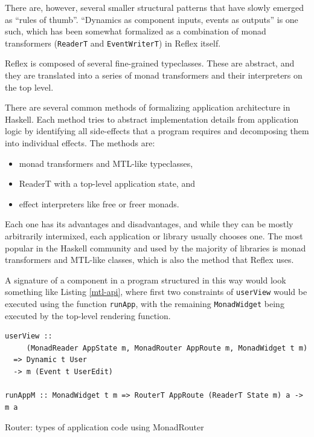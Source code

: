 \documentclass[english,zadani,odsaz]{fitthesis}
\begin{document}
There are, however, several smaller structural patterns that have slowly emerged
as ``rules of thumb''. ``Dynamics as component inputs, events as outputs'' is one
such, which has been somewhat formalized as a combination of monad transformers
(\texttt{ReaderT} and \texttt{EventWriterT}) in Reflex itself.

Reflex is composed of several fine-grained typeclasses. These are abstract, and
they are translated into a series of monad transformers and their interpreters
on the top level.

There are several common methods of formalizing application architecture in
Haskell. Each method tries to abstract implementation details from application
logic by identifying all side-effects that a program requires and decomposing
them into individual effects. The methods are:

\begin{itemize}
\item monad transformers and MTL-like typeclasses,
\item ReaderT with a top-level application state, and
\item effect interpreters like free or freer monads.
\end{itemize}

Each one has its advantages and disadvantages, and while they can be mostly
arbitrarily intermixed, each application or library usually chooses one. The
most popular in the Haskell community and used by the majority of libraries is
monad transformers and MTL-like classes, which is also the method that Reflex
uses.

A signature of a component in a program structured in this way would look
something like Listing \ref{mtl-api}, where first two constraints of \texttt{userView}
would be executed using the function \texttt{runApp}, with the remaining \texttt{MonadWidget}
being executed by the top-level rendering function.

\begin{listing}[tb]
\begin{verbatim}
userView ::
     (MonadReader AppState m, MonadRouter AppRoute m, MonadWidget t m)
  => Dynamic t User
  -> m (Event t UserEdit)

runAppM :: MonadWidget t m => RouterT AppRoute (ReaderT State m) a -> m a
\end{verbatim}
\caption{Router: types of application code using MonadRouter \label{mtl-api}}
\end{listing}
\end{document}
